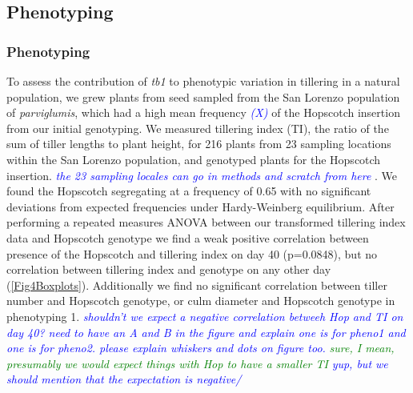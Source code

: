 \documentclass[12pt]{article}
\newcommand{\jri}[1]{\textcolor{blue}{ \emph{\scriptsize  #1}} }
\newcommand{\lev}[1]{\textcolor{green}{\emph{\scriptsize #1}} }
\begin{document}
\subsection*{Phenotyping}

\subsubsection*{Phenotyping}

To assess the contribution of \emph{tb1} to phenotypic variation in tillering in a natural population, we grew plants from seed sampled from the San Lorenzo population of \emph{parviglumis}, which had a high mean frequency \jri{(X)} of the Hopscotch insertion from our initial genotyping. We measured tillering index (TI), the ratio of the sum of tiller lengths to plant height, for 216 plants from 23 sampling locations within the San Lorenzo population, and genotyped plants for the Hopscotch insertion. \jri{the 23 sampling locales can go in methods and scratch from here}. We found the Hopscotch segregating at a frequency of 0.65 with no significant deviations from expected frequencies under Hardy-Weinberg equilibrium. After performing a repeated measures ANOVA between our transformed tillering index data and Hopscotch genotype we find a weak positive correlation between presence of the Hopscotch and tillering index on day 40 (p=0.0848), but no correlation between tillering index and genotype on any other day (\ref{Fig4Boxplots}). Additionally we find no significant correlation between tiller number and Hopscotch genotype, or culm diameter and Hopscotch genotype in phenotyping 1. \jri{shouldn't we expect a negative correlation betweeh Hop and TI on day 40? need to have an A and B in the figure and explain one is for pheno1 and one is for pheno2. please explain whiskers and dots on figure too.} \lev{sure, I mean, presumably we would expect things with Hop to have a smaller TI} \jri{yup, but we should mention that the expectation is negative/}
\end{document}
